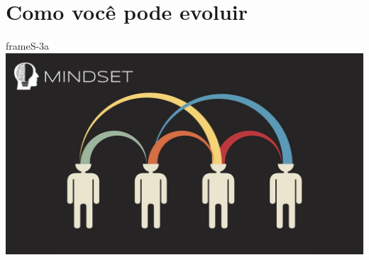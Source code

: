 \documentclass[14pt]{extreport}
\begin{document}
\newpage
\section*{Como você pode evoluir}

\ifnum{}
{}
\fi

\ifnum{}
{}
\fi

\ifnum{}
{}
\fi

\ifnum{}
{}
\fi

\ifnum{}
{}
\fi

\ifnum{}
{}
\fi

\ifnum{}
{}
\fi

\ifnum{}
{}
\fi



\begin{staticcontents*}{frameS-3a}
\includegraphics[width=210mm]{img/fig3.jpg}
\end{staticcontents*}
\end{document}
